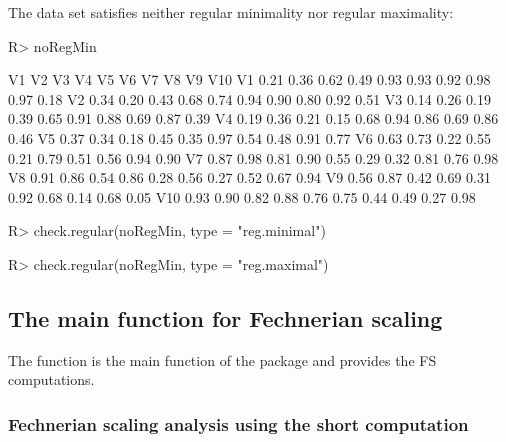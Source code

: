 \documentclass[nojss]{jss}
\begin{document}
The data set  satisfies neither regular minimality nor regular maximality:
\begin{CodeChunk}
\begin{CodeInput}
R> noRegMin
\end{CodeInput}
\begin{CodeOutput}
      V1   V2   V3   V4   V5   V6   V7   V8   V9  V10
V1  0.21 0.36 0.62 0.49 0.93 0.93 0.92 0.98 0.97 0.18
V2  0.34 0.20 0.43 0.68 0.74 0.94 0.90 0.80 0.92 0.51
V3  0.14 0.26 0.19 0.39 0.65 0.91 0.88 0.69 0.87 0.39
V4  0.19 0.36 0.21 0.15 0.68 0.94 0.86 0.69 0.86 0.46
V5  0.37 0.34 0.18 0.45 0.35 0.97 0.54 0.48 0.91 0.77
V6  0.63 0.73 0.22 0.55 0.21 0.79 0.51 0.56 0.94 0.90
V7  0.87 0.98 0.81 0.90 0.55 0.29 0.32 0.81 0.76 0.98
V8  0.91 0.86 0.54 0.86 0.28 0.56 0.27 0.52 0.67 0.94
V9  0.56 0.87 0.42 0.69 0.31 0.92 0.68 0.14 0.68 0.05
V10 0.93 0.90 0.82 0.88 0.76 0.75 0.44 0.49 0.27 0.98
\end{CodeOutput}
\begin{CodeInput}
R> check.regular(noRegMin, type = "reg.minimal")
\end{CodeInput}
\begin{CodeInput}
R> check.regular(noRegMin, type = "reg.maximal")
\end{CodeInput}
\end{CodeChunk}

\subsection{The main function for Fechnerian scaling}

The function  is the main function of the package and provides the FS computations. 

\subsubsection{Fechnerian scaling analysis using the short computation}
\end{document}
